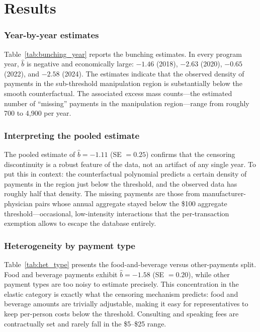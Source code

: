 \documentclass[12pt]{article}
\begin{document}


\section{Results}

\subsubsection*{Year-by-year estimates} Table~\ref{tab:bunching_year} reports the bunching estimates. In every program year, $\hat{b}$ is negative and economically large: $-1.46$ (2018), $-2.63$ (2020), $-0.65$ (2022), and $-2.58$ (2024). The estimates indicate that the observed density of payments in the sub-threshold manipulation region is substantially below the smooth counterfactual. The associated excess mass counts---the estimated number of ``missing'' payments in the manipulation region---range from roughly 700 to 4,900 per year.



\subsubsection*{Interpreting the pooled estimate} The pooled estimate of $\hat{b} = -1.11$ (SE $= 0.25$) confirms that the censoring discontinuity is a robust feature of the data, not an artifact of any single year. To put this in context: the counterfactual polynomial predicts a certain density of payments in the region just below the threshold, and the observed data has roughly half that density. The missing payments are those from manufacturer-physician pairs whose annual aggregate stayed below the \$100 aggregate threshold---occasional, low-intensity interactions that the per-transaction exemption allows to escape the database entirely.

\subsubsection*{Heterogeneity by payment type} Table~\ref{tab:het_type} presents the food-and-beverage versus other-payments split. Food and beverage payments exhibit $\hat{b} = -1.58$ (SE $= 0.20$), while other payment types are too noisy to estimate precisely. This concentration in the elastic category is exactly what the censoring mechanism predicts: food and beverage amounts are trivially adjustable, making it easy for representatives to keep per-person costs below the threshold. Consulting and speaking fees are contractually set and rarely fall in the \$5--\$25 range.
\end{document}
